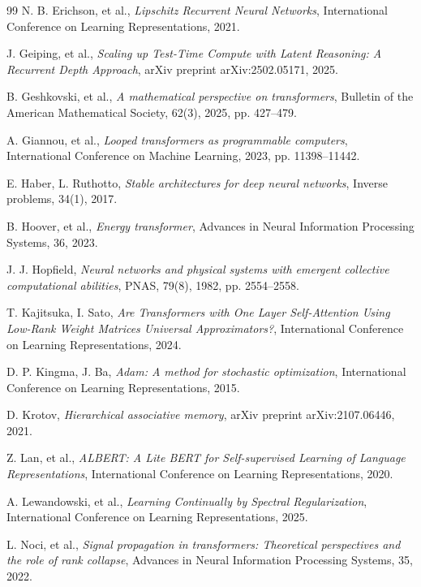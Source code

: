 \documentclass{zapiski}
\theoremstyle{plain}
\theoremstyle{definition}
\theoremstyle{remark}
\begin{document}
\begin{thebibliography}{99}
N. B. Erichson, et al., \emph{Lipschitz Recurrent Neural Networks}, International Conference on Learning Representations, 2021.

J. Geiping, et al., \emph{Scaling up Test-Time Compute with Latent Reasoning: A Recurrent Depth Approach}, arXiv preprint arXiv:2502.05171, 2025.

B. Geshkovski, et al., \emph{A mathematical perspective on transformers}, Bulletin of the American Mathematical Society, 62(3), 2025, pp. 427--479.

A. Giannou, et al., \emph{Looped transformers as programmable computers}, International Conference on Machine Learning, 2023, pp. 11398--11442.

E. Haber, L. Ruthotto, \emph{Stable architectures for deep neural networks}, Inverse problems, 34(1), 2017.

B. Hoover, et al., \emph{Energy transformer}, Advances in Neural Information Processing Systems, 36, 2023.

J. J. Hopfield, \emph{Neural networks and physical systems with emergent collective computational abilities}, PNAS, 79(8), 1982, pp. 2554--2558.

T. Kajitsuka, I. Sato, \emph{Are Transformers with One Layer Self-Attention Using Low-Rank Weight Matrices Universal Approximators?}, International Conference on Learning Representations, 2024.

D. P. Kingma, J. Ba, \emph{Adam: A method for stochastic optimization}, International Conference on Learning Representations, 2015.

D. Krotov, \emph{Hierarchical associative memory}, arXiv preprint arXiv:2107.06446, 2021.

Z. Lan, et al., \emph{ALBERT: A Lite BERT for Self-supervised Learning of Language Representations}, International Conference on Learning Representations, 2020.

A. Lewandowski, et al., \emph{Learning Continually by Spectral Regularization}, International Conference on Learning Representations, 2025.

L. Noci, et al., \emph{Signal propagation in transformers: Theoretical perspectives and the role of rank collapse}, Advances in Neural Information Processing Systems, 35, 2022.


\end{thebibliography}
\end{document}
